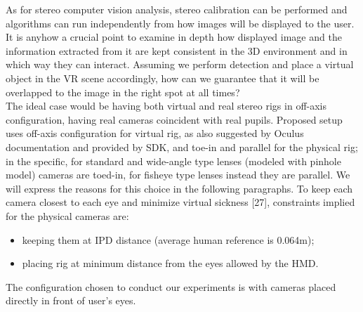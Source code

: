 As for stereo computer vision analysis, stereo calibration can be performed and algorithms can run independently from how images will be displayed to the user. It is anyhow a crucial point to examine in depth how displayed image and the information extracted from it are kept consistent in the 3D environment and in which way they can interact. Assuming we perform detection and place a virtual object in the VR scene accordingly, how can we guarantee that it will be overlapped to the image in the right spot at all times?\\
The ideal case would be having both virtual and real stereo rigs in off-axis configuration, having real cameras coincident with real pupils. Proposed setup uses off-axis configuration for virtual rig, as also suggested by Oculus documentation and provided by SDK, and toe-in and parallel for the physical rig; in the specific, for standard and wide-angle type lenses (modeled with pinhole model) cameras are toed-in, for fisheye type lenses instead they are parallel. We will express the reasons for this choice in the following paragraphs.
To keep each camera closest to each eye and minimize virtual sickness [27], constraints implied for the physical cameras are:
\begin{itemize}
\item keeping them at IPD distance (average human reference is 0.064m);
\item placing rig at minimum distance from the eyes allowed by the HMD.
\end{itemize}
The configuration chosen to conduct our experiments is with cameras placed directly in front of user’s eyes.

